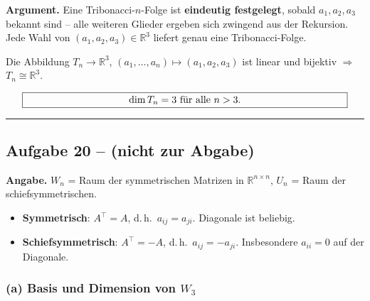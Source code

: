 \documentclass[a4paper,12pt]{article}
\begin{document}
\textbf{Argument.} Eine Tribonacci-$n$-Folge ist \textbf{eindeutig festgelegt}, sobald $a_1, a_2, a_3$ bekannt sind -- alle weiteren Glieder ergeben sich zwingend aus der Rekursion. Jede Wahl von $(a_1, a_2, a_3) \in \mathbb{R}^3$ liefert genau eine Tribonacci-Folge.

Die Abbildung $T_n \to \mathbb{R}^3$, $(a_1, \dots, a_n) \mapsto (a_1, a_2, a_3)$ ist linear und bijektiv $\Rightarrow$ $T_n \cong \mathbb{R}^3$.

\[
\fbox{\parbox{0.93\textwidth}{\centering
$\dim T_n = 3$ f\"ur alle $n > 3$.
}}
\]

\bigskip
\hrule
\bigskip

\subsection*{Aufgabe 20 -- (nicht zur Abgabe)}

\textbf{Angabe.} $W_n$ = Raum der symmetrischen Matrizen in $\mathbb{R}^{n \times n}$, $U_n$ = Raum der schiefsymmetrischen.

\begin{begriffe}
\begin{itemize}[leftmargin=*, nosep]
    \item \textbf{Symmetrisch}: $A^\top = A$, d.\,h.\ $a_{ij} = a_{ji}$. Diagonale ist beliebig.
    \item \textbf{Schiefsymmetrisch}: $A^\top = -A$, d.\,h.\ $a_{ij} = -a_{ji}$. Insbesondere $a_{ii} = 0$ auf der Diagonale.
\end{itemize}
\end{begriffe}

\subsubsection*{(a) Basis und Dimension von $W_3$}
\end{document}
